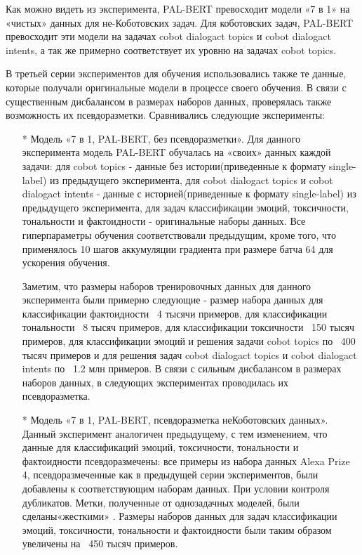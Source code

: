 Как можно видеть из эксперимента, PAL-BERT превосходит модели «7 в 1» на «чистых» данных для не-Коботовских задач. Для коботовских задач, PAL-BERT превосходит эти модели на задачах cobot dialogact topics и cobot dialogact intents, а так же примерно соответствует их уровню на задачах cobot topics.

В  третьей серии экспериментов для обучения использовались также те данные, которые получали оригинальные модели в процессе своего обучения. В связи с существенным дисбалансом в размерах наборов данных, проверялась также возможность их псевдоразметки. Сравнивались следующие эксперименты:
\begin{itemize}
\item[*] Модель «7 в 1, PAL-BERT, без псевдоразметки». Для данного эксперимента модель PAL-BERT обучалась на «своих» данных каждой задачи: для cobot topics - данные без истории(приведенные к формату single-label) из предыдущего эксперимента, для cobot dialogact topics и cobot dialogact intents - данные с историей(приведенные к формату single-label) из предыдущего эксперимента, для задач классификации эмоций, токсичности, тональности и фактоидности - оригинальные наборы данных. Все гиперпараметры обучения соответствовали предыдущим, кроме того, что применялось 10 шагов аккумуляции градиента при размере батча 64 для ускорения обучения.

Заметим, что размеры наборов тренировочных данных для данного эксперимента были примерно следующие - размер набора данных для классификации фактоидности ~4 тысячи примеров, для классификации тональности ~8 тысяч примеров, для классификации токсичности ~150 тысяч примеров, для классификации эмоций и решения задачи cobot topics по ~400 тысяч примеров и для решения задач cobot dialogact topics и cobot dialogact intents по ~1.2 млн примеров. В связи с сильным дисбалансом в размерах наборов данных, в следующих экспериментах проводилась их псевдоразметка.

\item[*] Модель «7 в 1, PAL-BERT, псевдоразметка неКоботовских данных». Данный эксперимент аналогичен предыдущему, с тем изменением, что данные для классификаций эмоций, токсичности, тональности и фактоидности псевдоразмечены: все примеры из набора данных Alexa Prize 4, псевдоразмеченные как в предыдущей серии экспериментов, были добавлены к соответствующим наборам данных. При условии контроля дубликатов. Метки, полученные от однозадачных моделей, были сделаны«жесткими» . Размеры наборов данных для задач классификации эмоций, токсичности, тональности и фактоидности были таким образом увеличены на ~450 тысяч примеров.


\end{itemize}
